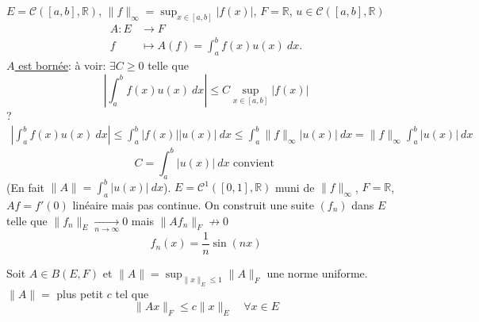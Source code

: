 \documentclass[a4paper]{report}
\newcommand\R{\ensuremath{\mathbb{R}}}
\theoremstyle{definition}
\begin{document}
\begin{eg}
    $E = \mathcal{C}([a, b], \R)$, $\|f\|_{\infty} = \sup_{x \in [a, b]} |f(x)|$, $F = \R$, $u \in \mathcal{C}([a, b], \R)$
    \begin{align*}
        A: E &\longrightarrow F \\
        f &\longmapsto A(f) = \int_{{a}}^{{b}} {f(x)u(x)} \: d{x} {}
    .\end{align*}
    \underline{$A$ est bornée}: à voir: $\exists C \ge 0$ telle que  
    \[
        \left| \int_{{a}}^{{b}} {f(x)u(x)} \: d{x} {} \right| \le C \sup_{x \in [a, b]} |f(x)|
    \] 
    ?
    \begin{align*}
        \left| \int_{{a}}^{{b}} {f(x)u(x)} \: d{x} {} \right| \le \int_{{a}}^{{b}} {|f(x)| |u(x)|} \: d{x} {} \le \int_{{a}}^{{b}} {\|f\|_{\infty}|u(x)|} \: d{x} {= \|f\|_{\infty} \int_{{a}}^{{b}} {|u(x)|} \: d{x} {}}
    \end{align*}
    \[
    C = \int_{{a}}^{{b}} {|u(x)|} \: d{x} \text{ convient }
    \] 
    (En fait $\|A\| = \int_{{a}}^{{b}} {|u(x)|} \: d{x} {}$). $E = \mathcal{C}^1([0,1], \R)$ muni de $\|f\|_{\infty}$, $F = \R$, $Af = f'(0)$ linéaire mais pas continue. On construit une suite  $(f_n)$ dans  $E$ telle que  $\|f_n\|_E \xrightarrow[n \to  \infty]{} 0$ mais $\|Af_n\|_F \not\to 0$
    \[
    f_n(x) = \frac{1}{n}\sin(nx)
    \] 
\end{eg}
\begin{prop}
   Soit $A \in B(E, F)$ et $\|A\| = \sup_{\|x\|_E \le 1} \|A\|_F$  une norme uniforme. $\|A\| = $ plus petit  $c$ tel que 
    \[
   \|Ax\|_F \le c \|x\|_E \quad \forall x \in E
   \] 
\end{prop}
\end{document}
